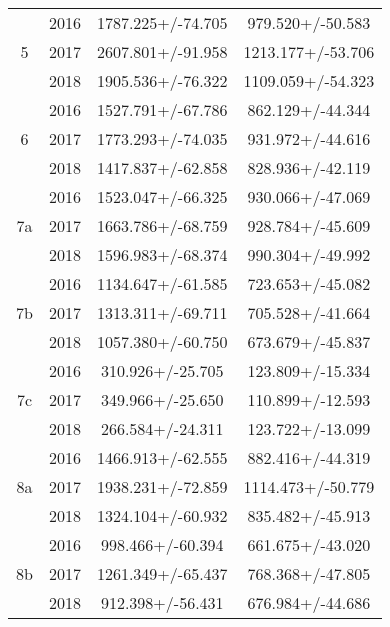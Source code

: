 \begin{table}
\begin{tabular}{cccc}
\cline{1-4}
\multirow{3}{*}{5} & 2016 &            1787.225+/-74.705 &             979.520+/-50.583 \\
   & 2017 &            2607.801+/-91.958 &            1213.177+/-53.706 \\
   & 2018 &            1905.536+/-76.322 &            1109.059+/-54.323 \\
\cline{1-4}
\multirow{3}{*}{6} & 2016 &            1527.791+/-67.786 &             862.129+/-44.344 \\
   & 2017 &            1773.293+/-74.035 &             931.972+/-44.616 \\
   & 2018 &            1417.837+/-62.858 &             828.936+/-42.119 \\
\cline{1-4}
\multirow{3}{*}{7a} & 2016 &            1523.047+/-66.325 &             930.066+/-47.069 \\
   & 2017 &            1663.786+/-68.759 &             928.784+/-45.609 \\
   & 2018 &            1596.983+/-68.374 &             990.304+/-49.992 \\
\cline{1-4}
\multirow{3}{*}{7b} & 2016 &            1134.647+/-61.585 &             723.653+/-45.082 \\
   & 2017 &            1313.311+/-69.711 &             705.528+/-41.664 \\
   & 2018 &            1057.380+/-60.750 &             673.679+/-45.837 \\
\cline{1-4}
\multirow{3}{*}{7c} & 2016 &             310.926+/-25.705 &             123.809+/-15.334 \\
   & 2017 &             349.966+/-25.650 &             110.899+/-12.593 \\
   & 2018 &             266.584+/-24.311 &             123.722+/-13.099 \\
\cline{1-4}
\multirow{3}{*}{8a} & 2016 &            1466.913+/-62.555 &             882.416+/-44.319 \\
   & 2017 &            1938.231+/-72.859 &            1114.473+/-50.779 \\
   & 2018 &            1324.104+/-60.932 &             835.482+/-45.913 \\
\cline{1-4}
\multirow{3}{*}{8b} & 2016 &             998.466+/-60.394 &             661.675+/-43.020 \\
   & 2017 &            1261.349+/-65.437 &             768.368+/-47.805 \\
   & 2018 &             912.398+/-56.431 &             676.984+/-44.686 \\
\bottomrule
\end{tabular}
\end{table}
